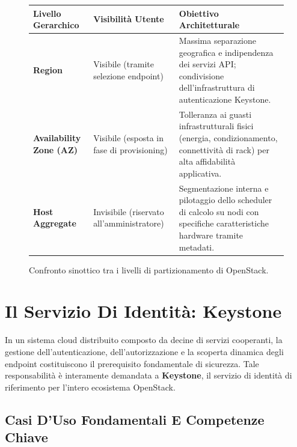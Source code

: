 \documentclass[11pt, a4paper]{article}
\begin{document}
\begin{figure}[H]
\centering
\begin{tabularx}{\textwidth}{p{3.5cm}p{3.5cm}X}
\toprule
\textbf{Livello Gerarchico} & \textbf{Visibilità Utente} & \textbf{Obiettivo Architetturale} \\
\midrule
\textbf{Region} & Visibile (tramite selezione endpoint) & Massima separazione geografica e indipendenza dei servizi API; condivisione dell'infrastruttura di autenticazione Keystone. \\
\addlinespace
\textbf{Availability Zone (AZ)} & Visibile (esposta in fase di provisioning) & Tolleranza ai guasti infrastrutturali fisici (energia, condizionamento, connettività di rack) per alta affidabilità applicativa. \\
\addlinespace
\textbf{Host Aggregate} & Invisibile (riservato all'amministratore) & Segmentazione interna e pilotaggio dello scheduler di calcolo su nodi con specifiche caratteristiche hardware tramite metadati. \\
\bottomrule
\end{tabularx}
\caption{Confronto sinottico tra i livelli di partizionamento di OpenStack.}
\end{figure}

\newpage


\section{Il Servizio Di Identità: Keystone}

In un sistema cloud distribuito composto da decine di servizi cooperanti, la gestione dell'autenticazione, dell'autorizzazione e la scoperta dinamica degli endpoint costituiscono il prerequisito fondamentale di sicurezza. Tale responsabilità è interamente demandata a \textbf{Keystone}, il servizio di identità di riferimento per l'intero ecosistema OpenStack.


\subsection{Casi D'Uso Fondamentali E Competenze Chiave}
\end{document}
